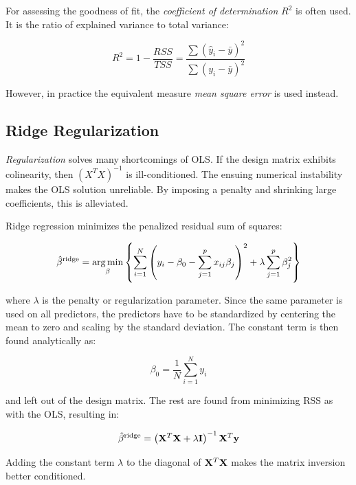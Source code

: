 For assessing the goodness of fit, the \textit{coefficient of determination}
\(R^{2}\) is often used. It is the ratio of explained variance to total variance:

\begin{equation*}
  R^{2} = 1 - \frac{RSS}{TSS} = \frac{\sum \left(\hat y_{i} - \bar{y} \right)^{2}}{\sum\left(y_{i} - \bar y \right)^{2}}
\end{equation*}

However, in practice the equivalent measure \textit{mean square error} is used instead.


\subsection{Ridge Regularization}\label{subsec:Ridge}

\textit{Regularization} solves many shortcomings of OLS.\@
If the design matrix exhibits colinearity, then  \(\left( X^{T}X
\right)^{-1}\) is ill-conditioned. The ensuing numerical instability makes the
OLS solution
unreliable. By imposing a penalty and shrinking large coefficients, this is alleviated.

Ridge regression minimizes the penalized residual sum of squares:

\begin{equation*}
  \hat\beta^{\text{ridge}}  = \operatorname*{arg\,min}_{\beta}\left\{ \sum_{i=1}^{N}\left( y_{i} - \beta_{0} - \sum_{j=1}^{p}x_{ij}\beta_{j} \right)^{2} + \lambda\sum_{j=1}^{p}\beta_{j}^{2} \right\}
\end{equation*}

where \(\lambda\) is the penalty or regularization parameter. Since the same
parameter is used on all predictors, the predictors have to be standardized by
centering the mean to zero and scaling by the standard deviation. The constant term
is then found analytically as:

\begin{equation*}
  \beta_{0} = \frac{1}{N}\sum_{i=1}^{N}y_{i}
\end{equation*}

and left out of the design matrix. The rest are found from minimizing
\(\text{RSS}\) as with the OLS, resulting in:

\begin{equation*}
  \hat\beta^{\text{ridge}} = \left( \vb{X}^{T}\vb{X} + \lambda\vb{I} \right)^{-1}\vb{X}^{T}\vb{y}
\end{equation*}

Adding the constant term \(\lambda\) to the diagonal of \(\vb{X}^{T}\vb{X}\) makes
the matrix inversion better conditioned.

